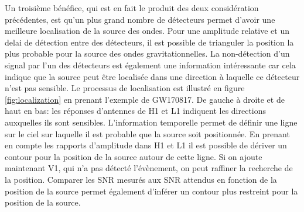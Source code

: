 Un troisième bénéfice, qui est en fait le produit des deux considération précédentes, est qu'un plus grand nombre de détecteurs permet d'avoir une meilleure localisation de la source des ondes.
Pour une amplitude relative et un delai de détection entre des détecteurs, il est possible de trianguler la position la plus probable pour la source des ondes gravitationnelles.
La non-détection d'un signal par l'un des détecteurs est également une information intéressante car cela indique que la source peut être localisée dans une direction à laquelle ce détecteur n'est pas sensible.
Le processus de localisation est illustré en figure \ref{fig:localization} en prenant l'exemple de GW170817.
De gauche à droite et de haut en bas: les réponses d'antennes de H1 et L1 indiquent les directions auxquelles ils sont sensibles.
L'information temporelle permet de définir une ligne sur le ciel sur laquelle il est probable que la source soit positionnée.
En prenant en compte les rapports d'amplitude dans H1 et L1 il est possible de dériver un contour pour la position de la source autour de cette ligne.
Si on ajoute maintenant V1, qui n'a pas détecté l'évènement, on peut raffiner la recherche de la position.
Comparer les SNR mesurés aux SNR attendus en fonction de la position de la source  permet également d'inférer un contour plus restreint pour la position de la source.

